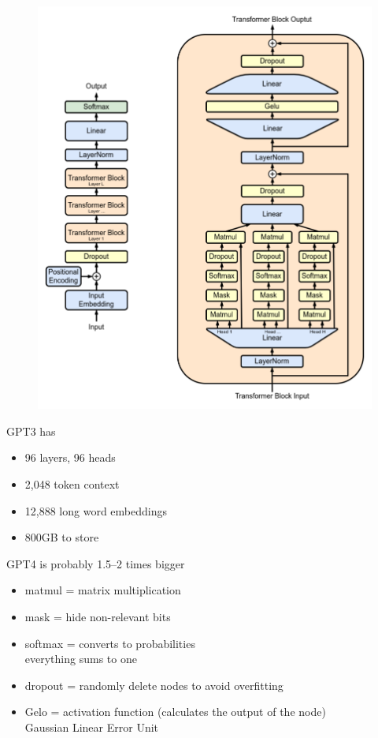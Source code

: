 \documentclass[25pt,a4paper,landscape,headrule,footrule,xetex]{foils}
\begin{document}


\begin{figure}      \includegraphics[height=0.8\textheight]{../pics/Full_GPT_architecture.png}
\end{figure}
\bigskip

GPT3 has
\begin{itemize}
\item 96 layers, 96 heads
\item 2,048 token context
\item  12,888 long word embeddings
\item 800GB to store
\end{itemize}
  GPT4 is probably 1.5--2 times bigger
\par

\newpage
\begin{itemize}
\item matmul = matrix multiplication
\item mask = hide non-relevant bits
\item softmax = converts to probabilities
  \\ everything sums to one
\item dropout = randomly delete nodes to avoid overfitting
\item Gelo = activation function (calculates the output of the node)
  \\ Gaussian Linear Error Unit

\end{itemize}
\end{document}
